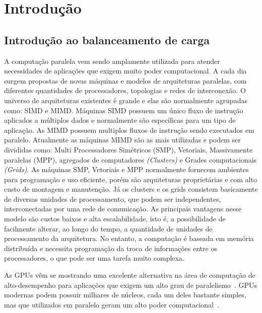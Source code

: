 \cleardoublepage
\pagestyle{fancy}

\chapter{Introdução}\label{intro}

\section{Introdução ao balanceamento de carga}\label{cap1:intro}

A computação paralela vem sendo amplamente utilizada para atender necessidades de aplicações que exigem muito poder computacional. A cada dia surgem propostas de novas máquinas e modelos de arquiteturas paralelas, com diferentes quantidades de processadores, topologias e redes de interconexão. O universo de arquiteturas existentes é grande e elas são normalmente agrupadas como: SIMD e MIMD. Máquinas SIMD possuem um único fluxo de instrução aplicados a múltiplos dados e normalmente são específicas para um tipo de aplicação. As MIMD possuem multiplos fluxos de instrução sendo executados em paralelo. Atualmente as máquinas MIMD são as mais utilizadas e podem ser divididas como: Multi Processadores Simétricos (SMP), Vetoriais, Massivamente paralelas (MPP), agregados de computadores \emph{(Clusters)} e Grades computacionais \emph{(Grids)}. As máquinas SMP, Vetoriais e MPP normalmente fornecem ambientes para programação e uso eficiente, porém são arquiteturas proprietárias e com alto custo de montagem e manutenção. Já os clusters e os grids consistem basicamente de diversas unidades de processamento, que podem ser independentes, interconectadas por uma rede de comunicação. As principais vantagens nesse modelo são custos baixos e alta escalabilidade, isto  é, a possibilidade de facilmente alterar, ao longo do tempo, a quantidade de unidades de processamento da arquitetura. No entanto, a computação é baseada em memória distribuída e necessita programação da troca de informações entre os processadores, o que pode ser uma tarefa muito complexa.

As GPUs vêm se mostrando uma excelente alternativa na área de computação de
alto-desempenho para aplicações que exigem um alto grau de
paralelismo~\cite{gpu}. GPUs modernas podem possuir milhares de núcleos, cada um
deles bastante simples, mas que utilizados em paralelo geram um alto poder
computacional~\cite{cuda}.

